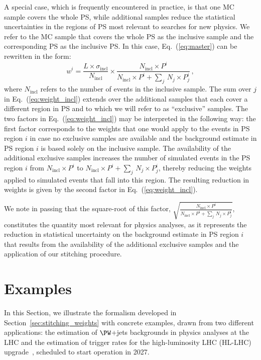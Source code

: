 \documentclass[twocolumn,epjc3]{svjour3}
\newcommand{\incl}{\ensuremath{\textrm{incl}}\xspace}
\begin{document}
A special case, which is frequently encountered in practice,
is that one MC sample covers the whole PS,
while additional samples reduce the statistical uncertainties in the regions of PS most relevant to searches for new physics.
We refer to the MC sample that covers the whole PS as the inclusive sample and the corresponding PS as the inclusive PS.
In this case, Eq.~(\ref{eq:master}) can be rewritten in the form:
\begin{equation}
w^{i} = \frac{L \times \sigma_{\incl}}{N_{\incl}} \times \frac{N_{\incl} \times P^{i}}{N_{\incl} \times P^{i} + \sum_{j} \, N_{j} \times P_{j}^{i}} \, ,
\label{eq:weight_incl}
\end{equation}
where $N_{\incl}$ refers to the number of events in the inclusive sample.
The sum over $j$ in Eq.~(\ref{eq:weight_incl}) extends over the additional samples that each cover a different region in PS
and to which we will refer to as ``exclusive'' samples.
The two factors in Eq.~(\ref{eq:weight_incl}) may be interpreted in the following way:
the first factor corresponds to the weights that one would apply to the events in PS region $i$ 
in case no exclusive samples are available and the background estimate in PS region $i$ is based solely on the inclusive sample.
The availability of the additional exclusive samples increases the number of simulated events in the PS region $i$ 
from $N_{\incl} \times P^{i}$ to $N_{\incl} \times P^{i} + \sum_{j} \, N_{j} \times P_{j}^{i}$,
thereby reducing the weights applied to simulated events that fall into this region.
The resulting reduction in weights is given by the second factor in Eq.~(\ref{eq:weight_incl}).

We note in passing that the square-root of this factor,
$\sqrt{\frac{N_{\incl} \times P^{i}}{N_{\incl} \times P^{i} + \sum_{j} \, N_{j} \times P_{j}^{i}}}$,
constitutes the quantity most relevant for physics analyses,
as it represents the reduction in statistical uncertainty on the background estimate in PS region $i$
that results from the availability of the additional exclusive samples and the application of our stitching procedure.


\section{Examples}
\label{sec:examples}

In this Section, we illustrate the formalism developed in Section~\ref{sec:stitching_weights} with concrete examples,
drawn from two different applications: the estimation of 
$\PW$+jets backgrounds in physics analyses at the LHC
and the estimation of trigger rates for the high-luminosity LHC (HL-LHC) upgrade~\cite{TDR_Phase2_LHC},
scheduled to start operation in 2027.
\end{document}
